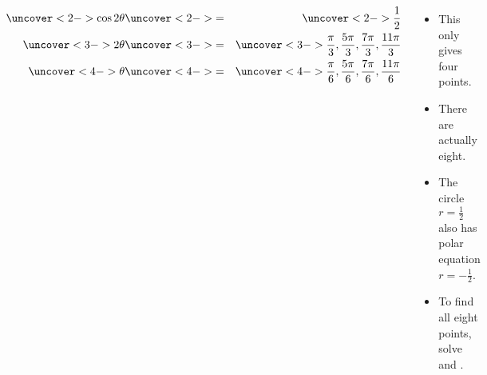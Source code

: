 \begin{frame}
\begin{example}
\begin{columns}[c]
\abovedisplayskip=0pt
\belowdisplayskip=0pt
\begin{eqnarray*}
\uncover<2->{%
\cos 2\theta%
}%
& \uncover<2->{ = } &%
\uncover<2->{%
\frac{1}{2}%
}\\%
\uncover<3->{%
2\theta%
}%
& \uncover<3->{ = } &%
\uncover<3->{%
\frac{\pi}{3}, \frac{5\pi}{3}, \frac{7\pi}{3}, \frac{11\pi}{3}%
}\\%
\uncover<4->{%
\theta%
}%
& \uncover<4->{ = } &%
\uncover<4->{%
\frac{\pi}{6}, \frac{5\pi}{6}, \frac{7\pi}{6}, \frac{11\pi}{6}%
}%
\end{eqnarray*}
\begin{itemize}
\item<5->  This only gives four points.
\item<6->  There are actually eight.
\item<7->  The circle $r = \frac{1}{2}$ also has polar equation $r = -\frac{1}{2}$.
\item<8->  To find all eight points, solve  and .
\end{itemize}
\end{columns}
\end{example}
\end{frame}
